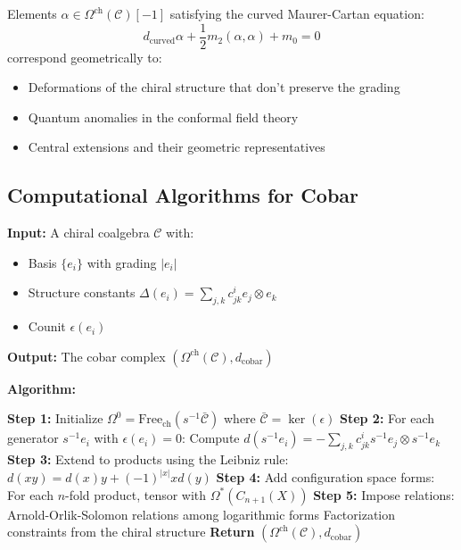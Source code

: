 \begin{theorem}\label{thm:curved-mc-cobar}
Elements $\alpha \in \Omega^{\text{ch}}(\mathcal{C})[-1]$ satisfying the curved Maurer-Cartan equation:
\[
d_{\text{curved}}\alpha + \frac{1}{2}m_2(\alpha, \alpha) + m_0 = 0
\]
correspond geometrically to:
\begin{itemize}
\item Deformations of the chiral structure that don't preserve the grading
\item Quantum anomalies in the conformal field theory
\item Central extensions and their geometric representatives
\end{itemize}
\end{theorem}

\subsection{Computational Algorithms for Cobar}

\begin{algorithm}
\textbf{Input:} A chiral coalgebra $\mathcal{C}$ with:
\begin{itemize}
\item Basis $\{e_i\}$ with grading $|e_i|$
\item Structure constants $\Delta(e_i) = \sum_{j,k} c_{jk}^i e_j \otimes e_k$
\item Counit $\epsilon(e_i)$
\end{itemize}

\textbf{Output:} The cobar complex $(\Omega^{\text{ch}}(\mathcal{C}), d_{\text{cobar}})$

\textbf{Algorithm:}
\begin{algorithmic}
\State \textbf{Step 1:} Initialize $\Omega^0 = \text{Free}_{\text{ch}}(s^{-1}\bar{\mathcal{C}})$ where $\bar{\mathcal{C}} = \ker(\epsilon)$
\State \textbf{Step 2:} For each generator $s^{-1}e_i$ with $\epsilon(e_i) = 0$:
\State \quad Compute $d(s^{-1}e_i) = -\sum_{j,k} c_{jk}^i s^{-1}e_j \otimes s^{-1}e_k$
\State \textbf{Step 3:} Extend to products using the Leibniz rule:
\State \quad $d(xy) = d(x)y + (-1)^{|x|}xd(y)$
\State \textbf{Step 4:} Add configuration space forms:
\State \quad For each $n$-fold product, tensor with $\Omega^*(C_{n+1}(X))$
\State \textbf{Step 5:} Impose relations:
\State \quad Arnold-Orlik-Solomon relations among logarithmic forms
\State \quad Factorization constraints from the chiral structure
\State \textbf{Return} $(\Omega^{\text{ch}}(\mathcal{C}), d_{\text{cobar}})$
\end{algorithmic}
\end{algorithm}

